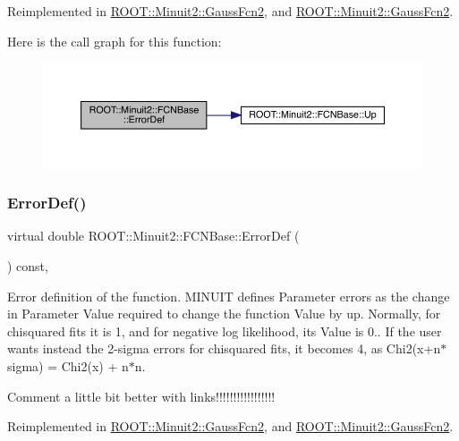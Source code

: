 Reimplemented in \mbox{\hyperlink{classROOT_1_1Minuit2_1_1GaussFcn2_ac240f7b6ecbb7bf842d786e3914c620a}{R\+O\+O\+T\+::\+Minuit2\+::\+Gauss\+Fcn2}}, and \mbox{\hyperlink{classROOT_1_1Minuit2_1_1GaussFcn2_ac240f7b6ecbb7bf842d786e3914c620a}{R\+O\+O\+T\+::\+Minuit2\+::\+Gauss\+Fcn2}}.

Here is the call graph for this function\+:
\nopagebreak
\begin{figure}[H]
\begin{center}
\leavevmode
\includegraphics[width=350pt]{dd/df4/classROOT_1_1Minuit2_1_1FCNBase_ac4592475c58a65b037ba97ab5f3cba10_cgraph}
\end{center}
\end{figure}
\mbox{\label{classROOT_1_1Minuit2_1_1FCNBase_ac4592475c58a65b037ba97ab5f3cba10}} 
\subsubsection{\texorpdfstring{ErrorDef()}{ErrorDef()}\hspace{0.1cm}{\footnotesize\ttfamily [3/3]}}
{\footnotesize\ttfamily virtual double R\+O\+O\+T\+::\+Minuit2\+::\+F\+C\+N\+Base\+::\+Error\+Def (\begin{DoxyParamCaption}{ }\end{DoxyParamCaption}) const\hspace{0.3cm}{\ttfamily [inline]}, {\ttfamily [virtual]}}

Error definition of the function. M\+I\+N\+U\+IT defines Parameter errors as the change in Parameter Value required to change the function Value by up. Normally, for chisquared fits it is 1, and for negative log likelihood, its Value is 0.. If the user wants instead the 2-\/sigma errors for chisquared fits, it becomes 4, as Chi2(x+n$\ast$sigma) = Chi2(x) + n$\ast$n.

Comment a little bit better with links!!!!!!!!!!!!!!!!! 

Reimplemented in \mbox{\hyperlink{classROOT_1_1Minuit2_1_1GaussFcn2_ac240f7b6ecbb7bf842d786e3914c620a}{R\+O\+O\+T\+::\+Minuit2\+::\+Gauss\+Fcn2}}, and \mbox{\hyperlink{classROOT_1_1Minuit2_1_1GaussFcn2_ac240f7b6ecbb7bf842d786e3914c620a}{R\+O\+O\+T\+::\+Minuit2\+::\+Gauss\+Fcn2}}.

